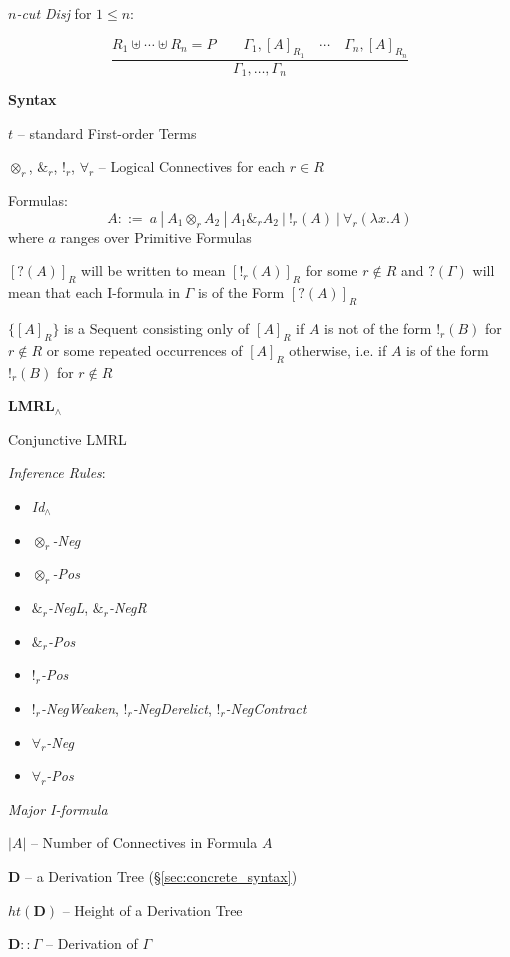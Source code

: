 \emph{$n$-cut Disj} for $1 \leq n$:

\[
  \frac{
    R_1 \uplus \cdots \uplus R_n = P \quad\quad
      \Gamma_1,[A]_{R_1} \quad \cdots \quad \Gamma_n,[A]_{R_n}
  }{
    \Gamma_1, \ldots, \Gamma_n
  }
\]


\textbf{Syntax}

$t$ -- standard First-order Terms

$\otimes_r$, $\&_r$, $!_r$, $\forall_r$ -- Logical Connectives for
each $r \in R$

Formulas:
\[
  A ::=\ a \ |\ A_1 \otimes_r A_2 \ |\ A_1 \&_r A_2 \ |\ !_r(A)
    \ |\ \forall_r(\lambda x.A)
\]
where $a$ ranges over Primitive Formulas

$[?(A)]_R$ will be written to mean $[!_r(A)]_R$ for some $r \notin R$
and $?(\Gamma)$ will mean that each I-formula in $\Gamma$ is of the
Form $[?(A)]_R$

$\{[A]_R\}$ is a Sequent consisting only of $[A]_R$ if $A$ is not of
the form $!_r(B)$ for $r \notin R$ or some repeated occurrences of
$[A]_R$ otherwise, i.e. if $A$ is of the form $!_r(B)$ for $r \notin
R$ %


\textbf{LMRL$_\wedge$}

Conjunctive LMRL

\emph{Inference Rules}:
\begin{itemize}
  \item \emph{Id$_\wedge$}
  \item \emph{$\otimes_r$-Neg}
  \item \emph{$\otimes_r$-Pos}
  \item \emph{$\&_r$-NegL}, \emph{$\&_r$-NegR}
  \item \emph{$\&_r$-Pos}
  \item \emph{$!_r$-Pos}
  \item \emph{$!_r$-NegWeaken}, \emph{$!_r$-NegDerelict},
    \emph{$!_r$-NegContract}
  \item \emph{$\forall_r$-Neg}
  \item \emph{$\forall_r$-Pos}
\end{itemize}

\emph{Major I-formula} %

$|A|$ -- Number of Connectives in Formula $A$

$\mathbf{D}$ -- a Derivation Tree (\S\ref{sec:concrete_syntax})

$ht(\mathbf{D})$ -- Height of a Derivation Tree

$\mathbf{D} :: \Gamma$ -- Derivation of $\Gamma$


